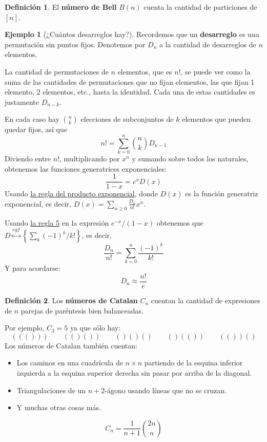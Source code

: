 \documentclass[spanish]{book}
\theoremstyle{definition}
\newtheorem*{defn}{Definición}
\newtheorem*{ejem}{Ejemplo}
\begin{document}
\begin{defn}
	El \textbf{número de Bell} $B(n)$ cuenta la cantidad de particiones de $[n]$.
\end{defn}
\begin{ejem}[¿Cuántos desarreglos hay?]
	Recordemos que un \textbf{desarreglo} es una permutación sin puntos fijos. Denotemos por $D_n$ a la cantidad de desarreglos de $n$ elementos.
	
	La cantidad de permutaciones de $n$ elementos, que es $n!$, se puede ver como la suma de las cantidades de permutaciones que no fijan elementos, las que fijan 1 elemento, 2 elementos, etc., hasta la identidad. Cada una de estas cantidades es justamente $D_{n-k}$.
	
	En cada caso hay ${n\choose k}$ elecciones de subconjuntos de $k$ elementos que pueden quedar fijos, así que
	\[n!=\sum_{k=0}^n{n\choose k}D_{n-1}\]
	Diviendo entre $n!$, multiplicando por $x^n$ y sumando sobre todos los naturales, obtenemos las funciones generatrices exponenciales:
	\[\frac{1}{1-x}=e^xD(x)\]
	Usando \hyperref[rule3p]{la regla del producto exponencial}, donde $D(x)$ es la función generatriz exponencial, es decir, $D(x)=\sum_{n\geq0}\frac{D_n}{n!}x^n$.
	
	Usando \hyperref[rule5]{la regla 5} en la expresión $e^{-x}/(1-x)$ obtenemos que $D\overset{egf}{\longleftrightarrow}\left\{\sum_k(-1)^k/k!\right\}$, es decir,
	\[\frac{D_n}{n!}=\sum_{k=0}^n\frac{(-1)^k}{k!}\]
	Y para acordarse:
	\[D_n\approx \frac{n!}{e}\]
\end{ejem}
\begin{defn}
	Los \textbf{números de Catalan} $C_n$ cuentan la cantidad de expresiones de $n$ parejas de paréntesis bien balanceadas.
\end{defn}
Por ejemplo, $C_3=5$ ya que sólo hay:
\[((()))\qquad(()())\qquad()()()\qquad()(())\qquad(())()\]
Los números de Catalan también cuentan:
\begin{itemize}
	\item Los caminos en una cuadrícula de $n\times n$ partiendo de la esquina inferior izquierda a la esquina superior derecha sin pasar por arriba de la diagonal.
	\item Triangulaciones de un $n+2$-ágono usando líneas que no se cruzan.
	\item Y muchas otras cosas más.
\end{itemize}
\begin{teo}
	\[C_n=\frac{1}{n+1}{2n\choose n}\]
\end{teo}
\end{document}
